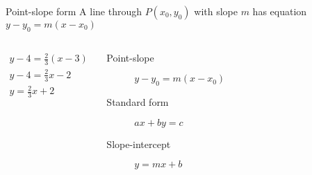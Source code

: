 \begin{frame}{Point-slope form}
  A line through $P(x_0,y_0)$ with slope $m$ has equation $y-y_0=m(x-x_0)$
  \begin{columns}
      \begin{align*}
        y-4=\frac{2}{3}(x-3) \\
        y-4=\frac{2}{3}x-2 \\
        y=\frac{2}{3}x+2
      \end{align*}
      \begin{description}
        \item[Point-slope] $y-y_0=m(x-x_0)$
        \item[Standard form] $ax+by=c$
        \item[Slope-intercept] $y=mx+b$
      \end{description} \bigskip
      \begin{flushright}
      \end{flushright}
  \end{columns}
\end{frame}


